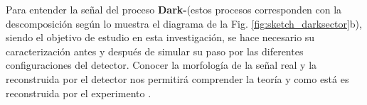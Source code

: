 Para entender la señal del proceso \textbf{Dark-}\SUSY (estos procesos corresponden con la descomposición según lo muestra el diagrama de la Fig. \ref{fig:sketch_darksector}b), siendo el objetivo de estudio en esta investigación, se hace necesario su caracterización antes y después de simular su paso por las diferentes configuraciones del detector. Conocer la morfología de la señal real y la reconstruida por el detector nos permitirá comprender la teoría y como está es reconstruida por el experimento \CMS.